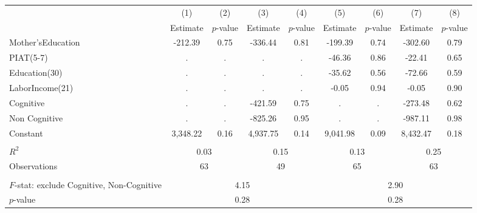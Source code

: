 \begin{tabular}{lcccccccc} \toprule
 & (1) & (2) & (3) & (4) & (5) & (6) & (7) & (8) \\
 & Estimate & $p$-value & Estimate & $p$-value  & Estimate & $p$-value  & Estimate & $p$-value  \\ \midrule 
Mother'sEducation &      -212.39 &         0.75 &      -336.44 &         0.81 &      -199.39 &         0.74 &      -302.60 &         0.79 \\  
PIAT(5-7) &            . &            . &            . &            . &       -46.36 &         0.86 &       -22.41 &         0.65 \\  
Education(30) &            . &            . &            . &            . &       -35.62 &         0.56 &       -72.66 &         0.59 \\  
LaborIncome(21) &            . &            . &            . &            . &        -0.05 &         0.94 &        -0.05 &         0.90 \\  
Cognitive &            . &            . &      -421.59 &         0.75 &            . &            . &      -273.48 &         0.62 \\  
Non Cognitive &            . &            . &      -825.26 &         0.95 &            . &            . &      -987.11 &         0.98 \\  
Constant &     3,348.22 &         0.16 &     4,937.75 &         0.14 &     9,041.98 &         0.09 &     8,432.47 &         0.18 \\  \\ \midrule
$R^2$  &          \multicolumn{2}{c}{0.03} &            \multicolumn{2}{c}{0.15} &                  \multicolumn{2}{c}{0.13} &               \multicolumn{2}{c}{0.25}  \\  
Observations &        \multicolumn{2}{c}{63} &               \multicolumn{2}{c}{49}  &             \multicolumn{2}{c}{65}  &         \multicolumn{2}{c}{63}  \\   \\ \midrule
$F$-stat: exclude Cognitive, Non-Cognitive &                    \multicolumn{4}{c}{4.15} &                   \multicolumn{4}{c}{2.90}  \\  
$p$-value &              \multicolumn{4}{c}{0.28} &                    \multicolumn{4}{c}{0.28}  \\      \bottomrule \end{tabular}